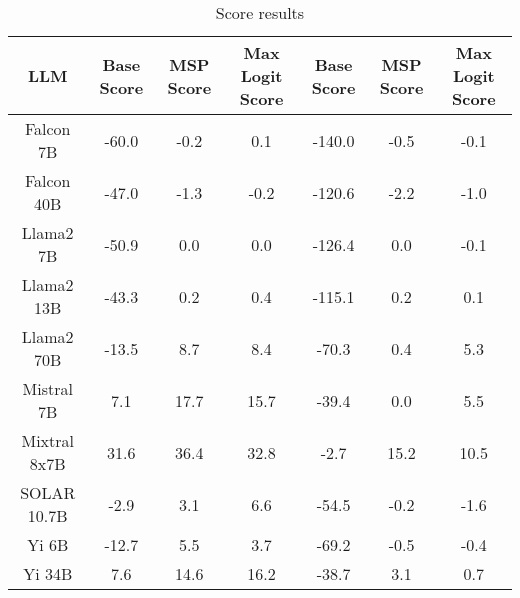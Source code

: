 \renewcommand\arraystretch{1.2}
\begin{table*}
\centering
\begin{tabular}{c|c|c|c|c|c|c}
LLM & Base Score & MSP Score & Max Logit Score & Base Score & MSP Score & Max Logit Score\\ \hline
Falcon 7B & -60.0 & -0.2 & 0.1 & -140.0 & -0.5 & -0.1\\
Falcon 40B & -47.0 & -1.3 & -0.2 & -120.6 & -2.2 & -1.0\\
Llama2 7B & -50.9 & 0.0 & 0.0 & -126.4 & 0.0 & -0.1\\
Llama2 13B & -43.3 & 0.2 & 0.4 & -115.1 & 0.2 & 0.1\\
Llama2 70B & -13.5 & 8.7 & 8.4 & -70.3 & 0.4 & 5.3\\
Mistral 7B & 7.1 & 17.7 & 15.7 & -39.4 & 0.0 & 5.5\\
Mixtral 8x7B & 31.6 & 36.4 & 32.8 & -2.7 & 15.2 & 10.5\\
SOLAR 10.7B & -2.9 & 3.1 & 6.6 & -54.5 & -0.2 & -1.6\\
Yi 6B & -12.7 & 5.5 & 3.7 & -69.2 & -0.5 & -0.4\\
Yi 34B & 7.6 & 14.6 & 16.2 & -38.7 & 3.1 & 0.7\\
\hline
\end{tabular}
\caption{Score results}
\end{table*}
\label{tab:score}
